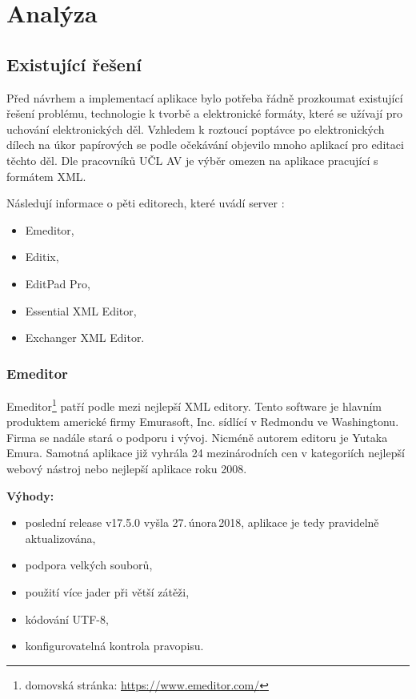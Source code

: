 \chapter{Analýza}

    \section{Existující řešení}
        Před návrhem a implementací aplikace bylo potřeba řádně prozkoumat existující řešení problému, technologie k tvorbě a elektronické formáty, které se užívají pro uchování elektronických děl. Vzhledem k roztoucí poptávce po elektronických dílech na úkor papírových se podle očekávání objevilo mnoho aplikací pro editaci těchto děl. Dle pracovníků UČL AV je výběr omezen na aplikace pracující s formátem XML.
        
        Následují informace o pěti editorech, které uvádí server \cite{tei-wiki}:
        \begin{itemize}
            \item Emeditor,
            \item Editix,
            \item EditPad Pro,
            \item Essential XML Editor,
            \item Exchanger XML Editor.
        \end{itemize}

        \subsection{Emeditor}
            Emeditor\footnote{domovská stránka: \url{https://www.emeditor.com/}} patří podle \cite{tei-wiki} mezi nejlepší XML editory. Tento software je hlavním produktem americké firmy Emurasoft, Inc. sídlící v Redmondu ve Washingtonu. Firma se nadále stará o podporu i vývoj. Nicméně autorem editoru je Yutaka Emura. Samotná aplikace již vyhrála 24 mezinárodních cen v kategoriích nejlepší webový nástroj nebo nejlepší aplikace roku 2008. 
            
            \textbf{Výhody:}
                \begin{itemize}
                    \item poslední release v17.5.0 vyšla 27.\,února\,2018, aplikace je tedy pravidelně aktualizována,
                    \item podpora velkých souborů,
                    \item použití více jader při větší zátěži,
                    \item kódování UTF-8,
                    \item konfigurovatelná kontrola pravopisu.
                \end{itemize}
                
